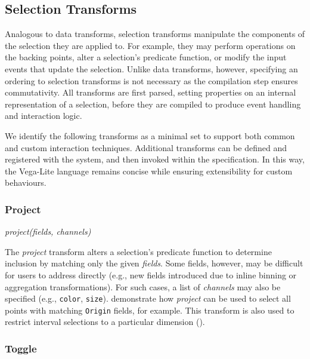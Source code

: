 \subsection{Selection Transforms}

Analogous to data transforms, selection transforms manipulate the components of
the selection they are applied to. For example, they may perform operations on
the backing points, alter a selection's predicate function, or modify the input
events that update the selection. Unlike data transforms, however, specifying an
ordering to selection transforms is not necessary as the compilation step
ensures commutativity. All transforms are first parsed, setting properties on an
internal representation of a selection, before they are compiled to produce
event handling and interaction logic.

We identify the following transforms as a minimal set to support both common and
custom interaction techniques. Additional transforms can be defined and
registered with the system, and then invoked within the specification. In this
way, the Vega-Lite language remains concise while ensuring extensibility for
custom behaviours.


\subsubsection{Project}

\centerline{\emph{project(fields, channels)}}

The \emph{project} transform alters a selection's predicate function to
determine inclusion by matching only the given \emph{fields}. Some fields,
however, may be difficult for users to address directly (e.g., new fields
introduced due to inline binning or aggregation transformations). For such
cases, a list of \emph{channels} may also be specified (e.g., \texttt{color},
\texttt{size}).  demonstrate how \emph{project} can
be used to select all points with matching \texttt{Origin} fields, for example.
This transform is also used to restrict interval selections to a particular
dimension ().

\subsubsection{Toggle}

